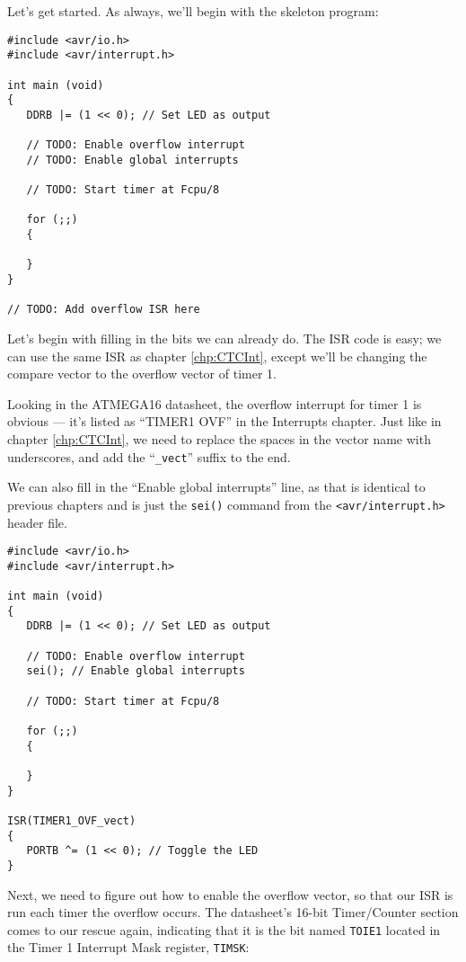 \documentclass[a4paper,oneside,notitlepage]{book}
\begin{document}
Let's get started. As always, we'll begin with the skeleton program: 

\begin{center}
\begin{lstlisting}
#include <avr/io.h>
#include <avr/interrupt.h>

int main (void)
{
   DDRB |= (1 << 0); // Set LED as output

   // TODO: Enable overflow interrupt
   // TODO: Enable global interrupts

   // TODO: Start timer at Fcpu/8

   for (;;)
   {

   }
}

// TODO: Add overflow ISR here 
\end{lstlisting}
\end{center}

Let's begin with filling in the bits we can already do. The ISR code is easy; we can use the same ISR as chapter \ref{chp:CTCInt}, except we'll be changing the compare vector to the overflow vector of timer 1.

Looking in the ATMEGA16 datasheet, the overflow interrupt for timer 1 is obvious --- it's listed as ``TIMER1 OVF'' in the Interrupts chapter. Just like in chapter \ref{chp:CTCInt}, we need to replace the spaces in the vector name with underscores, and add the ``\texttt{\_vect}'' suffix to the end.

We can also fill in the ``Enable global interrupts'' line, as that is identical to previous chapters and is just the \texttt{sei()} command from the \texttt{<avr/interrupt.h>} header file.

\begin{center}
\begin{lstlisting}
#include <avr/io.h>
#include <avr/interrupt.h>

int main (void)
{
   DDRB |= (1 << 0); // Set LED as output

   // TODO: Enable overflow interrupt
   sei(); // Enable global interrupts

   // TODO: Start timer at Fcpu/8

   for (;;)
   {

   }
}

ISR(TIMER1_OVF_vect)
{
   PORTB ^= (1 << 0); // Toggle the LED
} 
\end{lstlisting}
\end{center}

Next, we need to figure out how to enable the overflow vector, so that our ISR is run each timer the overflow occurs. The datasheet's 16-bit Timer/Counter section comes to our rescue again, indicating that it is the bit named \texttt{TOIE1} located in the Timer 1 Interrupt Mask register, \texttt{TIMSK}:
\end{document}
